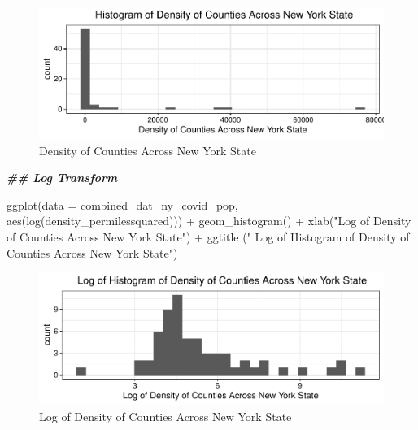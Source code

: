 \documentclass[
  12pt,
]{article}
\newenvironment{Shaded}{\begin{snugshade}}{\end{snugshade}}
\newcommand{\AttributeTok}[1]{\textcolor[rgb]{0.77,0.63,0.00}{#1}}
\newcommand{\DocumentationTok}[1]{\textcolor[rgb]{0.56,0.35,0.01}{\textbf{\textit{#1}}}}
\newcommand{\FunctionTok}[1]{\textcolor[rgb]{0.00,0.00,0.00}{#1}}
\newcommand{\NormalTok}[1]{#1}
\newcommand{\SpecialCharTok}[1]{\textcolor[rgb]{0.00,0.00,0.00}{#1}}
\newcommand{\StringTok}[1]{\textcolor[rgb]{0.31,0.60,0.02}{#1}}
\begin{document}
\begin{figure}

\includegraphics{EDA_Final_Group_Project_files/figure-latex/unnamed-chunk-10-1} \hfill{}

\caption{Density of Counties Across New York State}\label{fig:unnamed-chunk-10}
\end{figure}

\begin{Shaded}
\begin{Highlighting}[]
\DocumentationTok{\#\# Log Transform}

\FunctionTok{ggplot}\NormalTok{(}\AttributeTok{data =}\NormalTok{ combined\_dat\_ny\_covid\_pop, }\FunctionTok{aes}\NormalTok{(}\FunctionTok{log}\NormalTok{(density\_permilessquared))) }\SpecialCharTok{+}
  \FunctionTok{geom\_histogram}\NormalTok{() }\SpecialCharTok{+}
  \FunctionTok{xlab}\NormalTok{(}\StringTok{"Log of Density of Counties Across New York State"}\NormalTok{) }\SpecialCharTok{+}
  \FunctionTok{ggtitle}\NormalTok{ (}\StringTok{" Log of Histogram of Density of Counties Across New York State"}\NormalTok{)}
\end{Highlighting}
\end{Shaded}

\begin{figure}

\includegraphics{EDA_Final_Group_Project_files/figure-latex/unnamed-chunk-11-1} \hfill{}

\caption{Log of Density of Counties Across New York State}\label{fig:unnamed-chunk-11}
\end{figure}
\end{document}
